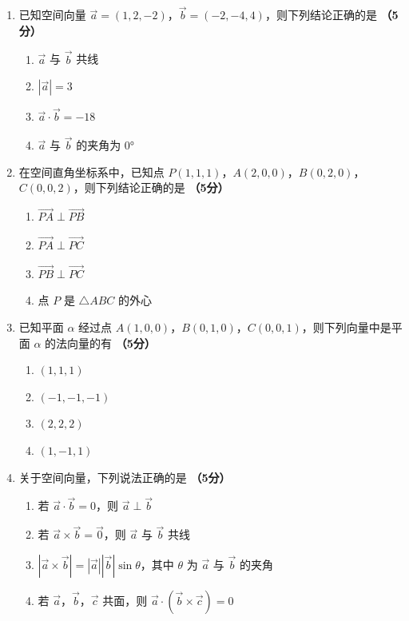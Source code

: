 \documentclass[12pt, a4paper]{ctexart}
\newcommand{\score}[1]{\hfill\textbf{（#1分）}}
\begin{document}
\vspace{0.5em}

\begin{enumerate}[resume]
\item 已知空间向量 $\vec{a}=(1,2,-2)$，$\vec{b}=(-2,-4,4)$，则下列结论正确的是 \score{5}
\begin{enumerate}[label=\Alph*.]
\item $\vec{a}$ 与 $\vec{b}$ 共线
\item $|\vec{a}|=3$
\item $\vec{a}\cdot\vec{b}=-18$
\item $\vec{a}$ 与 $\vec{b}$ 的夹角为 $0°$
\end{enumerate}

\item 在空间直角坐标系中，已知点 $P(1,1,1)$，$A(2,0,0)$，$B(0,2,0)$，$C(0,0,2)$，则下列结论正确的是 \score{5}
\begin{enumerate}[label=\Alph*.]
\item $\overrightarrow{PA}\perp\overrightarrow{PB}$
\item $\overrightarrow{PA}\perp\overrightarrow{PC}$
\item $\overrightarrow{PB}\perp\overrightarrow{PC}$
\item 点 $P$ 是 $\triangle ABC$ 的外心
\end{enumerate}

\item 已知平面 $\alpha$ 经过点 $A(1,0,0)$，$B(0,1,0)$，$C(0,0,1)$，则下列向量中是平面 $\alpha$ 的法向量的有 \score{5}
\begin{enumerate}[label=\Alph*.]
\item $(1,1,1)$
\item $(-1,-1,-1)$
\item $(2,2,2)$
\item $(1,-1,1)$
\end{enumerate}

\item 关于空间向量，下列说法正确的是 \score{5}
\begin{enumerate}[label=\Alph*.]
\item 若 $\vec{a}\cdot\vec{b}=0$，则 $\vec{a}\perp\vec{b}$
\item 若 $\vec{a}\times\vec{b}=\vec{0}$，则 $\vec{a}$ 与 $\vec{b}$ 共线
\item $|\vec{a}\times\vec{b}|=|\vec{a}||\vec{b}|\sin\theta$，其中 $\theta$ 为 $\vec{a}$ 与 $\vec{b}$ 的夹角
\item 若 $\vec{a}$，$\vec{b}$，$\vec{c}$ 共面，则 $\vec{a}\cdot(\vec{b}\times\vec{c})=0$
\end{enumerate}
\end{enumerate}
\end{document}
